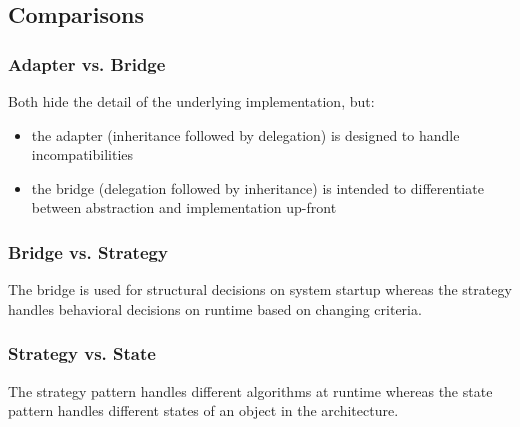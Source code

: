 \subsection{Comparisons}

\subsubsection{Adapter vs. Bridge}
Both hide the detail of the underlying implementation, but:
\begin{itemize}
   \item the adapter (inheritance followed by delegation) is designed to handle incompatibilities
   \item the bridge (delegation followed by inheritance) is intended to differentiate between abstraction and implementation up-front
 \end{itemize}

 \subsubsection{Bridge vs. Strategy}
 The bridge is used for structural decisions on system startup whereas the strategy handles behavioral decisions on runtime based on changing criteria.

\subsubsection{Strategy vs. State}
The strategy pattern handles different algorithms at runtime whereas the state pattern handles different states of an object in the architecture.

\newpage
